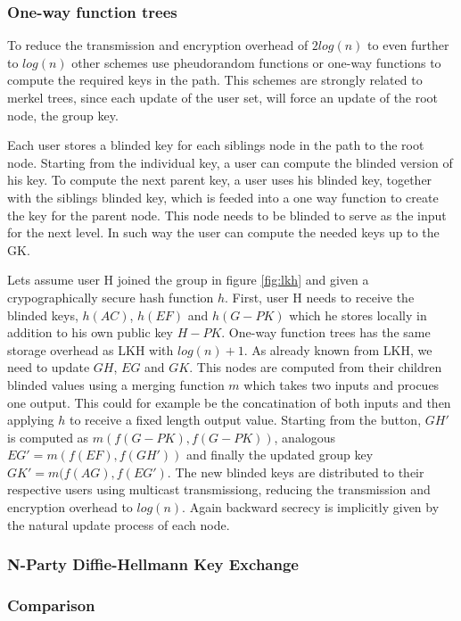 \subsubsection{One-way function trees}
To reduce the transmission and encryption overhead of $2log(n)$ to even further to $log(n)$ other schemes use pheudorandom functions \cite{canetti1999multicast} or one-way functions \cite{sherman2003key} to compute the required keys in the path. This schemes are strongly related to merkel trees, since each update of the user set, will force an update of the root node, the group key.

Each user stores a blinded key for each siblings node in the path to the root node. Starting from the individual key, a user can compute the blinded version of his key. To compute the next parent key, a user uses his blinded key, together with the siblings blinded key, which is feeded into a one way function to create the key for the parent node. This node needs to be blinded to serve as the input for the next level. In such way the user can compute the needed keys up to the GK. 

Lets assume user H joined the group in figure \ref{fig:lkh} and given a crypographically secure hash function $h$. First, user H needs to receive the blinded keys, $h(AC)$, $h(EF)$ and $h(G-PK)$ which he stores locally in addition to his own public key $H-PK$. One-way function trees has the same storage overhead as LKH with $log(n) + 1$.  As already known from LKH, we need to update $GH$, $EG$ and $GK$. This nodes are computed from their children blinded values using a merging function $m$ which takes two inputs and procues one output. This could for example be the concatination of both inputs and then applying $h$ to receive a fixed length output value. Starting from the button,  $GH'$ is computed as $m(f(G-PK), f(G-PK))$, analogous $EG' = m(f(EF), f(GH'))$ and finally the updated group key $GK' = m(f(AG), f(EG')$. The new blinded keys are distributed to their respective users using multicast transmissiong, reducing the transmission and encryption overhead to $log(n)$. Again backward secrecy is implicitly given by the natural update process of each node.

\subsubsection{N-Party Diffie-Hellmann Key Exchange}
\cite{steiner1996diffie}


\subsubsection{Comparison}

